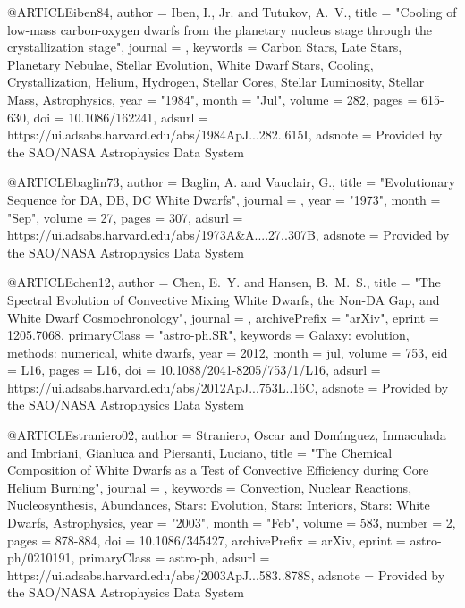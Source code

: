 \documentclass[a4paper,fleqn,usenatbib]{mnras}
\begin{document}
{{{{{{{{{{{@ARTICLE{iben84,
       author = {{Iben}, I., Jr. and {Tutukov}, A.~V.},
        title = "{Cooling of low-mass carbon-oxygen dwarfs from the planetary nucleus stage through the crystallization stage}",
      journal = {\apj},
     keywords = {Carbon Stars, Late Stars, Planetary Nebulae, Stellar Evolution, White Dwarf Stars, Cooling, Crystallization, Helium, Hydrogen, Stellar Cores, Stellar Luminosity, Stellar Mass, Astrophysics},
         year = "1984",
        month = "Jul",
       volume = {282},
        pages = {615-630},
          doi = {10.1086/162241},
       adsurl = {https://ui.adsabs.harvard.edu/abs/1984ApJ...282..615I},
      adsnote = {Provided by the SAO/NASA Astrophysics Data System}
}

@ARTICLE{baglin73,
       author = {{Baglin}, A. and {Vauclair}, G.},
        title = "{Evolutionary Sequence for DA, DB, DC White Dwarfs}",
      journal = {\aap},
         year = "1973",
        month = "Sep",
       volume = {27},
        pages = {307},
       adsurl = {https://ui.adsabs.harvard.edu/abs/1973A&A....27..307B},
      adsnote = {Provided by the SAO/NASA Astrophysics Data System}
}

@ARTICLE{chen12,
   author = {{Chen}, E.~Y. and {Hansen}, B.~M.~S.},
    title = "{The Spectral Evolution of Convective Mixing White Dwarfs, the Non-DA Gap, and White Dwarf Cosmochronology}",
  journal = {\apjl},
archivePrefix = "arXiv",
   eprint = {1205.7068},
 primaryClass = "astro-ph.SR",
 keywords = {Galaxy: evolution, methods: numerical, white dwarfs},
     year = 2012,
    month = jul,
   volume = 753,
      eid = {L16},
    pages = {L16},
      doi = {10.1088/2041-8205/753/1/L16},
   adsurl = {https://ui.adsabs.harvard.edu/abs/2012ApJ...753L..16C},
  adsnote = {Provided by the SAO/NASA Astrophysics Data System}
}

@ARTICLE{straniero02,
       author = {{Straniero}, Oscar and {Dom{\'\i}nguez}, Inmaculada and
         {Imbriani}, Gianluca and {Piersanti}, Luciano},
        title = "{The Chemical Composition of White Dwarfs as a Test of Convective Efficiency during Core Helium Burning}",
      journal = {\apj},
     keywords = {Convection, Nuclear Reactions, Nucleosynthesis, Abundances, Stars: Evolution, Stars: Interiors, Stars: White Dwarfs, Astrophysics},
         year = "2003",
        month = "Feb",
       volume = {583},
       number = {2},
        pages = {878-884},
          doi = {10.1086/345427},
archivePrefix = {arXiv},
       eprint = {astro-ph/0210191},
 primaryClass = {astro-ph},
       adsurl = {https://ui.adsabs.harvard.edu/abs/2003ApJ...583..878S},
      adsnote = {Provided by the SAO/NASA Astrophysics Data System}
}

}}}}}}}}}}}
\end{document}

